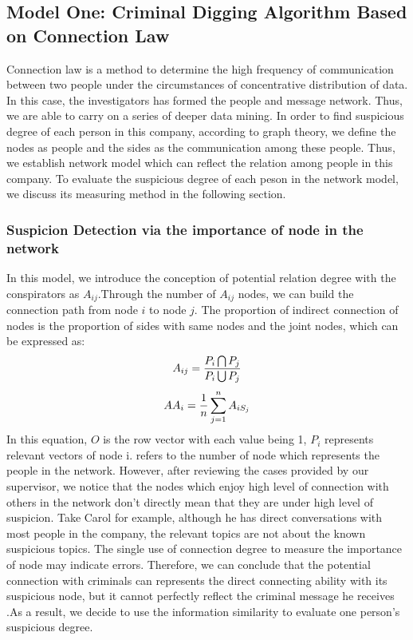 \documentclass[12pt]{article}
\begin{document}
\begin{itemize}
\begin{itemize}
\subsection{Model One: Criminal Digging Algorithm Based on Connection Law}
	Connection law is a method to determine the high frequency of communication between two people under the circumstances of concentrative distribution of data. In this case, the investigators has formed the people and message network. Thus, we are able to carry on a series of deeper data mining.
	In order to find suspicious degree of each person in this company, according to graph theory, we define the nodes as people and the sides as the communication among these people. Thus, we establish network model which can reflect the relation among people in this company.
         To evaluate the suspicious degree  of each peson in the network model, we discuss its measuring method in the following section.
\subsubsection{Suspicion Detection via the importance of node in the network}
	In this model, we introduce the conception of potential relation degree with the conspirators as $A_{ij}$.Through the number of $A_{ij}$ nodes, we can build the connection path from node $i$ to node $j$.
	The proportion of indirect connection of nodes is the proportion of sides with same nodes and the joint nodes, which can be expressed as:
\begin{equation}
\centering
A_{ij} = \frac{P_i \bigcap P_j}{P_i \bigcup P_j}
\end{equation}
\begin{equation}
\centering
AA_i = \frac{1}{n}\sum_{j=1}^{n}A_{iS_j}
\end{equation}
	In this equation, $O$ is the row vector with each value being 1, $P_i$ represents relevant vectors of node i.  refers to the number of node which represents the people in the network.
	However, after reviewing the cases provided by our supervisor, we notice that the nodes which enjoy high level of connection with others in the network don’t directly mean that they are under high level of suspicion. Take Carol for example, although he has direct conversations with most people in the company, the relevant topics are not about the known suspicious topics. The single use of connection degree to measure the importance of node may indicate errors. Therefore, we can conclude that the potential connection with criminals can represents the direct connecting ability with its suspicious node, but it cannot perfectly reflect the criminal message he receives .As a result, we decide to use the information similarity to evaluate one person’s suspicious degree.
	

\end{itemize}
\end{itemize}
\end{document}
